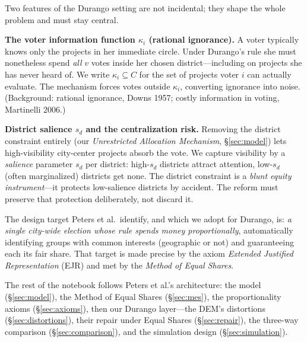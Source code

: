\documentclass[11pt,letterpaper]{article}
\theoremstyle{definition}
\theoremstyle{plain}
\theoremstyle{remark}
\newcommand{\projects}{C}          %
\newcommand{\votes}{v}             %
\begin{document}
Two features of the Durango setting are not incidental; they shape the whole problem and must stay
central.

\begin{naming}
\textbf{The voter information function $\kappa_i$ (rational ignorance).} A voter typically knows
only the projects in her immediate circle. Under Durango's rule she must nonetheless spend
\emph{all} $\votes$ votes inside her chosen district---including on projects she has never heard of.
We write $\kappa_i \subseteq \projects$ for the set of projects voter $i$ can actually evaluate.
The mechanism forces votes outside $\kappa_i$, converting ignorance into noise. (Background:
rational ignorance, Downs 1957; costly information in voting, Martinelli 2006.)
\end{naming}

\begin{naming}
\textbf{District salience $s_d$ and the centralization risk.} Removing the district constraint
entirely (our \emph{Unrestricted Allocation Mechanism}, \S\ref{sec:model}) lets high-visibility
city-center projects absorb the vote. We capture visibility by a \emph{salience} parameter $s_d$
per district: high-$s_d$ districts attract attention, low-$s_d$ (often marginalized) districts get
none. The district constraint is a \emph{blunt equity instrument}---it protects low-salience
districts by accident. The reform must preserve that protection deliberately, not discard it.
\end{naming}

\begin{keyidea}
The design target Peters et al.\ identify, and which we adopt for Durango, is: \emph{a single
city-wide election whose rule spends money proportionally}, automatically identifying groups with
common interests (geographic or not) and guaranteeing each its fair share. That target is made
precise by the axiom \emph{Extended Justified Representation} (EJR) and met by the \emph{Method of
Equal Shares}.
\end{keyidea}

The rest of the notebook follows Peters et al.'s architecture: the model
(\S\ref{sec:model}), the Method of Equal Shares (\S\ref{sec:mes}), the proportionality axioms
(\S\ref{sec:axioms}), then our Durango layer---the DEM's distortions (\S\ref{sec:distortions}),
their repair under Equal Shares (\S\ref{sec:repair}), the three-way comparison
(\S\ref{sec:comparison}), and the simulation design (\S\ref{sec:simulation}).

\end{document}

